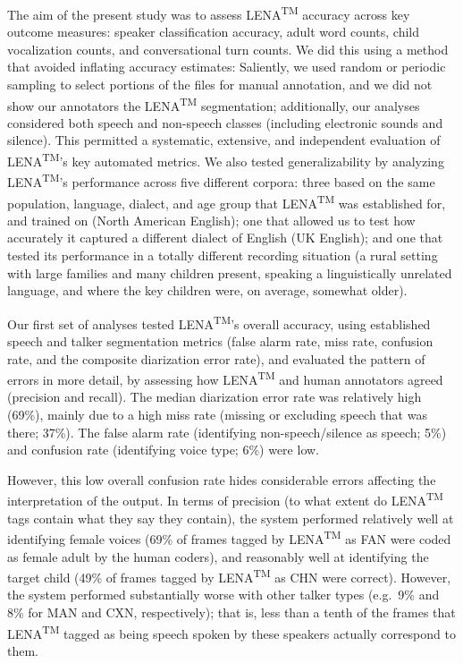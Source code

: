 \documentclass[english,table,man,floatsintext]{apa6}
\begin{document}
The aim of the present study was to assess LENA\textsuperscript{TM} accuracy across key outcome measures: speaker classification accuracy, adult word counts, child vocalization counts, and conversational turn counts. We did this using a method that avoided inflating accuracy estimates: Saliently, we used random or periodic sampling to select portions of the files for manual annotation, and we did not show our annotators the LENA\textsuperscript{TM} segmentation; additionally, our analyses considered both speech and non-speech classes (including electronic sounds and silence). This permitted a systematic, extensive, and independent evaluation of LENA\textsuperscript{TM}'s key automated metrics. We also tested generalizability by analyzing LENA\textsuperscript{TM}'s performance across five different corpora: three based on the same population, language, dialect, and age group that LENA\textsuperscript{TM} was established for, and trained on (North American English); one that allowed us to test how accurately it captured a different dialect of English (UK English); and one that tested its performance in a totally different recording situation (a rural setting with large families and many children present, speaking a linguistically unrelated language, and where the key children were, on average, somewhat older).

Our first set of analyses tested LENA\textsuperscript{TM}'s overall accuracy, using established speech and talker segmentation metrics (false alarm rate, miss rate, confusion rate, and the composite diarization error rate), and evaluated the pattern of errors in more detail, by assessing how LENA\textsuperscript{TM} and human annotators agreed (precision and recall). The median diarization error rate was relatively high (69\%), mainly due to a high miss rate (missing or excluding speech that was there; 37\%). The false alarm rate (identifying non-speech/silence as speech; 5\%) and confusion rate (identifying voice type; 6\%) were low.

However, this low overall confusion rate hides considerable errors affecting the interpretation of the output. In terms of precision (to what extent do LENA\textsuperscript{TM} tags contain what they say they contain), the system performed relatively well at identifying female voices (69\% of frames tagged by LENA\textsuperscript{TM} as FAN were coded as female adult by the human coders), and reasonably well at identifying the target child (49\% of frames tagged by LENA\textsuperscript{TM} as CHN were correct). However, the system performed substantially worse with other talker types (e.g.~9\% and 8\% for MAN and CXN, respectively); that is, less than a tenth of the frames that LENA\textsuperscript{TM} tagged as being speech spoken by these speakers actually correspond to them.
\end{document}

